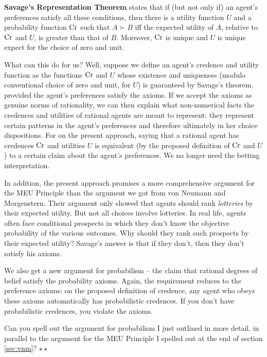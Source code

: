 \textbf{Savage's Representation Theorem} states that if (but not only
if) an agent's preferences satisfy all these conditions, then there is
a utility function $U$ and a probability function $\text{Cr}$ such that $A
\succ B$ iff the expected utility of $A$, relative to $\text{Cr}$ and $U$,
is greater than that of $B$. Moreover, $\text{Cr}$ is unique and $U$ is
unique expect for the choice of zero and unit.

What can this do for us? Well, suppose we define an agent's credence
and utility function as the functions $\text{Cr}$ and $U$ whose existence
and uniqueness (modulo conventional choice of zero and unit, for $U$)
is guaranteed by Savage's theorem, provided the agent's preferences
satisfy the axioms. If we accept the axioms as genuine norms of
rationality, we can then explain what non-numerical facts the
credences and utilities of rational agents are meant to represent:
they represent certain patterns in the agent's preferences and
therefore ultimately in her choice dispositions. For on the present
approach, saying that a rational agent has credences $\text{Cr}$ and
utilities $U$ is equivalent (by the proposed definition of $\text{Cr}$ and
$U$) to a certain claim about the agent's preferences. We no longer
need the betting interpretation.

In addition, the present approach promises a more comprehensive
argument for the MEU Principle than the argument we got from von
Neumann and Morgenstern. Their argument only showed that agents should
rank \emph{lotteries} by their expected utility. But not all choices
involve lotteries. In real life, agents often face conditional
prospects in which they don't know the objective probability of the
various outcomes. Why should they rank such prospects by their
expected utility? Savage's answer is that if they don't, then they
don't satisfy his axioms.

We also get a new argument for probabilism -- the claim that rational
degrees of belief satisfy the probability axioms. Again, the
requirement reduces to the preference axioms: on the proposed
definition of credence, any agent who obeys these axioms automatically
has probabilistic credences. If you don't have probabilistic
credences, you violate the axioms.

\begin{exercise}
  Can you spell out the argument for probabilism I just outlined in
  more detail, in parallel to the argument for the MEU Principle I
  spelled out at the end of section \ref{sec:vnm}? $\star\star$
\end{exercise}


